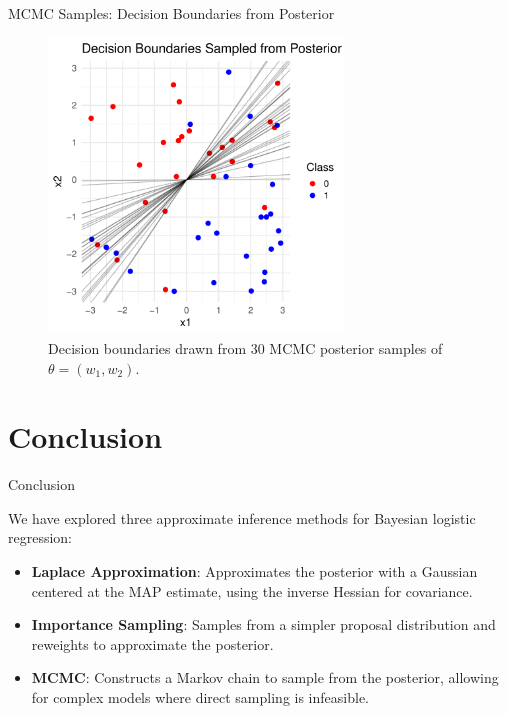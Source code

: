 \documentclass{beamer}
\begin{document}
\begin{frame}{MCMC Samples: Decision Boundaries from Posterior}
  \begin{figure}
    \centering
    \includegraphics[width=0.7\textwidth]{figures/mcmc.pdf}
    \caption{Decision boundaries drawn from 30 MCMC posterior samples of \(\theta = (w_1, w_2)\).}
  \end{figure}
\end{frame}

\section{Conclusion}

\begin{frame}{Conclusion}

  We have explored three approximate inference methods for Bayesian logistic regression:
  \begin{itemize}
    \item \textbf{Laplace Approximation}: Approximates the posterior with a Gaussian centered at the MAP estimate, using the inverse Hessian for covariance.
    \item \textbf{Importance Sampling}: Samples from a simpler proposal distribution and reweights to approximate the posterior.
    \item \textbf{MCMC}: Constructs a Markov chain to sample from the posterior, allowing for complex models where direct sampling is infeasible.
  \end{itemize}

\end{frame}
\end{document}
